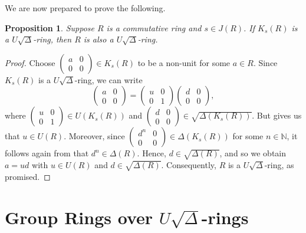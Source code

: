 \documentclass[11pt]{amsart}
\newtheorem{proposition}[theorem]{Proposition}
\theoremstyle{definition}
\begin{document}
\medskip

We are now prepared to prove the following.

\begin{proposition}
Suppose $R$ is a commutative ring and $s \in J(R)$. If $K_s(R)$ is a $U\sqrt{\Delta}$-ring, then $R$ is also a $U\sqrt{\Delta}$-ring.
\end{proposition}

\begin{proof}
Choose	$
	\begin{pmatrix}
		a & 0 \\
		0 & 0
	\end{pmatrix} \in K_s(R)
	$
to be a non-unit for some $a \in R$. Since $K_s(R)$ is a $U\sqrt{\Delta}$-ring, we can write
	\[
	\begin{pmatrix}
		a & 0 \\
		0 & 0
	\end{pmatrix} =
	\begin{pmatrix}
		u & 0 \\
		0 & 1
	\end{pmatrix}
	\begin{pmatrix}
		d & 0 \\
		0 & 0
	\end{pmatrix},
	\]
where
	$
	\begin{pmatrix}
		u & 0 \\
		0 & 1
	\end{pmatrix} \in U(K_s(R))$ and
	$\begin{pmatrix}
		d & 0 \\
		0 & 0
	\end{pmatrix} \in \sqrt{\Delta(K_s(R))}.
	$
But \cite[Lemma 4.1]{mdjo} gives us that $u \in U(R)$. Moreover, since
	$
	\begin{pmatrix}
		d^n & 0 \\
		0 & 0
	\end{pmatrix} \in \Delta(K_s(R))
	$
for some $n \in \mathbb{N}$, it follows again from \cite[Lemma 4.1]{mdjo} that $d^n \in \Delta(R)$. Hence, $d \in \sqrt{\Delta(R)}$, and so we obtain $a = ud$ with $u \in U(R)$ and $d \in \sqrt{\Delta(R)}$. Consequently, $R$ is a $U\sqrt{\Delta}$-ring, as promised.
\end{proof}


\section{Group Rings over $U\sqrt{\Delta}$-rings}\label{sec4}
\end{document}
